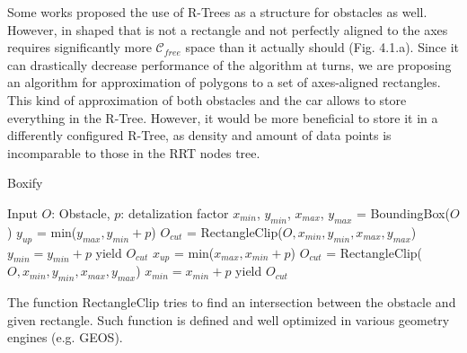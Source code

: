 \documentclass[a4paper,12pt]{article}
\DeclareRobustCommand{\[}{\begin{equation}}
\DeclareRobustCommand{\]}{\end{equation}}
\numberwithin{equation}{section}
\numberwithin{algorithm}{section}
\begin{document}
Some works proposed the use of R-Trees as a structure for obstacles as well. However, in shaped that is not a rectangle and not perfectly aligned to the axes requires significantly
more $\mathcal{C}_{free}$ space than it actually should (Fig. 4.1.a). Since it can drastically decrease performance of the algorithm at turns, we are proposing an algorithm for
approximation of polygons to a set of axes-aligned rectangles. This kind of approximation of both obstacles and the car allows to store everything in the R-Tree. However, it would be more beneficial to store it in a differently configured R-Tree,
as density and amount of data points is incomparable to those in the RRT nodes tree.

\begin{algorithm}[H]
    \caption{Boxify}
    \begin{algorithmic}[1]
    \State Input $O$: Obstacle, $p$: detalization factor 
    \State $x_{min}$, $y_{min}$, $x_{max}$, $y_{max}$ = BoundingBox($O$)
    \State $y_{up}$ = min($y_{max}, y_{min}+p$)
    \State $O_{cut}$ = RectangleClip($O, x_{min}, y_{min}, x_{max}, y_{max}$)
    \State $y_{min} = y_{min} + p$
    \State yield $O_{cut}$
    \EndWhile
    \Else
    \State $x_{up}$ = min($x_{max}, x_{min}+p$)
    \State $O_{cut}$ = RectangleClip($O, x_{min}, y_{min}, x_{max}, y_{max}$)
    \State $x_{min} = x_{min} + p$
    \State yield $O_{cut}$
    \EndWhile
    \EndIf
    \end{algorithmic}
\end{algorithm}

The function RectangleClip tries to find an intersection between the obstacle and given rectangle. Such function is defined and well optimized in various geometry engines (e.g. GEOS).
\end{document}
